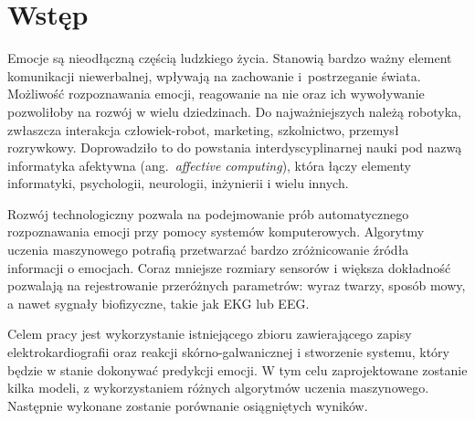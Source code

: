 \chapter*{Wstęp}\label{ch:wstep}

Emocje są nieodłączną częścią ludzkiego życia.
Stanowią bardzo ważny element komunikacji niewerbalnej, wpływają na zachowanie i~postrzeganie świata.
Możliwość rozpoznawania emocji, reagowanie na nie oraz ich wywoływanie pozwoliłoby na rozwój w wielu dziedzinach.
Do najważniejszych należą robotyka, zwłaszcza interakcja człowiek-robot, marketing, szkolnictwo, przemysł rozrywkowy.
Doprowadziło to do powstania interdyscyplinarnej nauki pod nazwą informatyka afektywna (ang.~\textit{affective computing}), która łączy elementy informatyki, psychologii, neurologii, inżynierii i wielu innych.

Rozwój technologiczny pozwala na podejmowanie prób automatycznego rozpoznawania emocji przy pomocy systemów komputerowych.
Algorytmy uczenia maszynowego potrafią przetwarzać bardzo zróżnicowanie źródła informacji o emocjach.
Coraz mniejsze rozmiary sensorów i większa dokładność pozwalają na rejestrowanie przeróżnych parametrów: wyraz twarzy, sposób mowy, a nawet sygnały biofizyczne, takie jak EKG lub EEG\@.

Celem pracy jest wykorzystanie istniejącego zbioru zawierającego zapisy elektrokardiografii oraz reakcji skórno-galwanicznej i stworzenie systemu, który będzie w stanie dokonywać predykcji emocji.
W tym celu zaprojektowane zostanie kilka modeli, z wykorzystaniem różnych algorytmów uczenia maszynowego.
Następnie wykonane zostanie porównanie osiągniętych wyników.
